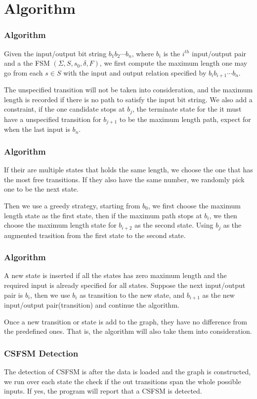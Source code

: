 \documentclass[aspectratio=169]{beamer}
\begin{document}
\section{Algorithm}

\begin{frame}
\frametitle{Algorithm}
Given the input/output bit string $b_1b_2\cdots b_n$, where $b_i$ is the $i^{th}$ input/output pair and a the FSM $(\Sigma, S, s_0, \delta, F)$, we first compute the maximum length one may go from each $s \in S$ with the input and output relation specified by $b_ib_{i+1}\cdots b_n$. 

The unspecified transition will not be taken into consideration, and the maximum length is recorded if there is no path to satisfy the input bit string. We also add a constraint, if the one candidate stops at $b_j$, the terminate state for the it must have a unspecified transition for $b_{j+1}$ to be the maximum length path, expect for when the last input is $b_n$.
\end{frame}

\begin{frame}
\frametitle{Algorithm}
If their are multiple states that holds the same length, we choose the one that has the most free transitions. If they also have the same number, we randomly pick one to be the next state.

Then we use a greedy strategy, starting from $b_0$, we first choose the maximum length state as the first state, then if the maximum path stops at $b_i$, we then choose the maximum length state for $b_{i + 2}$ as the second state. Using $b_j$ as the augmented trasition from the first state to the second state.
\end{frame}

\begin{frame}
\frametitle{Algorithm}
A new state is inserted if all the states has zero maximum length and the required input is already specified for all states. Suppose the next input/output pair is $b_i$, then we use $b_i$ as transition to the new state, and $b_{i + 1}$ as the new input/output pair(transition) and continue the algorithm.

Once a new transition or state is add to the graph, they have no difference from the predefined ones. That is, the algorithm will also take them into consideration.

\end{frame}

\begin{frame}
\frametitle{CSFSM Detection}
The detection of CSFSM is after the data is loaded and the graph is constructed, we run over each state the check if the out transitions span the whole possible inputs. If yes, the program will report that a CSFSM is detected.
\end{frame}
\end{document}
